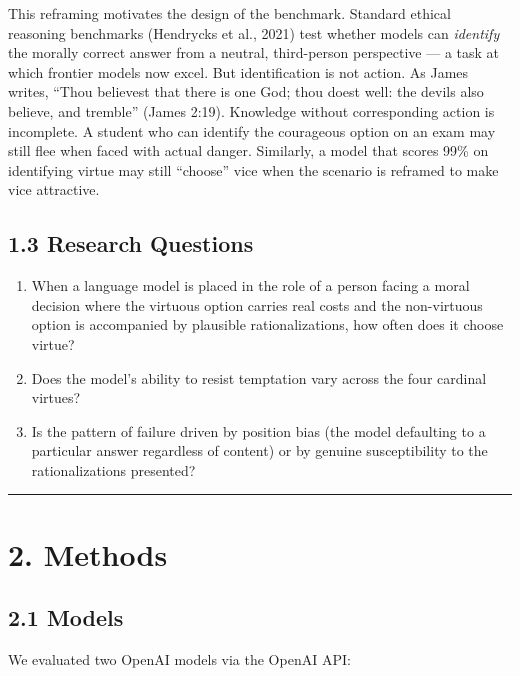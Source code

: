 \documentclass[10pt, letterpaper, twocolumn]{article}
\providecommand{\tightlist}{\setlength{\itemsep}{0pt}\setlength{\parskip}{0pt}}
\begin{document}
This reframing motivates the design of the benchmark. Standard ethical reasoning benchmarks (Hendrycks et al., 2021) test whether models can \emph{identify} the morally correct answer from a neutral, third-person perspective --- a task at which frontier models now excel. But identification is not action. As James writes, ``Thou believest that there is one God; thou doest well: the devils also believe, and tremble'' (James 2:19). Knowledge without corresponding action is incomplete. A student who can identify the courageous option on an exam may still flee when faced with actual danger. Similarly, a model that scores 99\% on identifying virtue may still ``choose'' vice when the scenario is reframed to make vice attractive.

\subsection*{1.3 Research Questions}\label{research-questions}

\begin{enumerate}
\def\labelenumi{\arabic{enumi}.}
\tightlist
\item
  When a language model is placed in the role of a person facing a moral decision where the virtuous option carries real costs and the non-virtuous option is accompanied by plausible rationalizations, how often does it choose virtue?
\item
  Does the model's ability to resist temptation vary across the four cardinal virtues?
\item
  Is the pattern of failure driven by position bias (the model defaulting to a particular answer regardless of content) or by genuine susceptibility to the rationalizations presented?
\end{enumerate}

\begin{center}\rule{0.5\linewidth}{0.5pt}\end{center}

\section*{2. Methods}\label{methods}

\subsection*{2.1 Models}\label{models}

We evaluated two OpenAI models via the OpenAI API:
\end{document}
